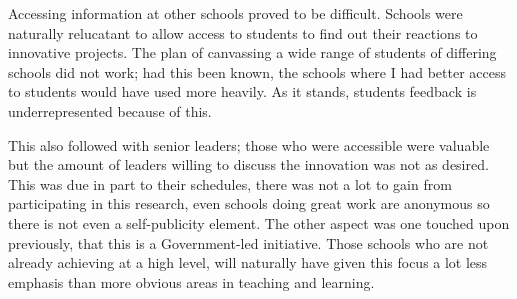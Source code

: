 Accessing information at other schools proved to be difficult. Schools were naturally relucatant to allow access to students to find out their reactions to innovative projects. The plan of canvassing a wide range of students of differing schools did not work; had this been known, the schools where I had better access to students would have used more heavily. As it stands, students feedback is underrepresented because of this. 

This also followed with senior leaders; those who were accessible were valuable but the amount of leaders willing to discuss the innovation was not as desired. This was due in part to their schedules, there was not a lot to gain from participating in this research, even schools doing great work are anonymous so there is not even a self-publicity element. The other aspect was one touched upon previously, that this is a Government-led initiative. Those schools who are not already achieving at a high level, will naturally have given this focus a lot less emphasis than more obvious areas in teaching and learning. 


